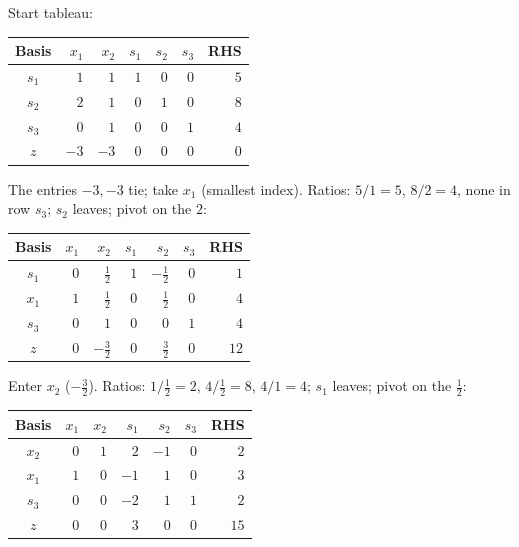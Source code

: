 \begin{solutions}
  \item Start tableau:
        \begin{center}
        \begin{tabular}{c|rrrrr|r}
        \hline
        Basis & $x_1$ & $x_2$ & $s_1$ & $s_2$ & $s_3$ & RHS\\
        \hline
        $s_1$ & $1$ & $1$ & $1$ & $0$ & $0$ & $5$\\
        $s_2$ & $2$ & $1$ & $0$ & $1$ & $0$ & $8$\\
        $s_3$ & $0$ & $1$ & $0$ & $0$ & $1$ & $4$\\
        \hline
        $z$ & $-3$ & $-3$ & $0$ & $0$ & $0$ & $0$\\
        \hline
        \end{tabular}
        \end{center}
        The entries $-3,-3$ tie; take $x_1$ (smallest index). Ratios:
        $5/1=5$, $8/2=4$, none in row $s_3$; $s_2$ leaves; pivot on the
        $2$:
        \begin{center}
        \begin{tabular}{c|rrrrr|r}
        \hline
        Basis & $x_1$ & $x_2$ & $s_1$ & $s_2$ & $s_3$ & RHS\\
        \hline
        $s_1$ & $0$ & $\tfrac{1}{2}$ & $1$ & $-\tfrac{1}{2}$ & $0$ & $1$\\
        $x_1$ & $1$ & $\tfrac{1}{2}$ & $0$ & $\tfrac{1}{2}$ & $0$ & $4$\\
        $s_3$ & $0$ & $1$ & $0$ & $0$ & $1$ & $4$\\
        \hline
        $z$ & $0$ & $-\tfrac{3}{2}$ & $0$ & $\tfrac{3}{2}$ & $0$ & $12$\\
        \hline
        \end{tabular}
        \end{center}
        Enter $x_2$ ($-\tfrac{3}{2}$). Ratios: $1/\tfrac{1}{2}=2$,
        $4/\tfrac{1}{2}=8$, $4/1=4$; $s_1$ leaves; pivot on the
        $\tfrac{1}{2}$:
        \begin{center}
        \begin{tabular}{c|rrrrr|r}
        \hline
        Basis & $x_1$ & $x_2$ & $s_1$ & $s_2$ & $s_3$ & RHS\\
        \hline
        $x_2$ & $0$ & $1$ & $2$ & $-1$ & $0$ & $2$\\
        $x_1$ & $1$ & $0$ & $-1$ & $1$ & $0$ & $3$\\
        $s_3$ & $0$ & $0$ & $-2$ & $1$ & $1$ & $2$\\
        \hline
        $z$ & $0$ & $0$ & $3$ & $0$ & $0$ & $15$\\

\end{tabular}
\end{center}
\end{solutions}
